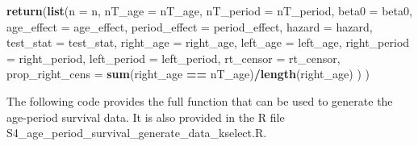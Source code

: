 \documentclass[11pt,]{article}
\newenvironment{Shaded}{\begin{snugshade}}{\end{snugshade}}
\newcommand{\KeywordTok}[1]{\textcolor[rgb]{0.13,0.29,0.53}{\textbf{#1}}}
\newcommand{\DataTypeTok}[1]{\textcolor[rgb]{0.13,0.29,0.53}{#1}}
\newcommand{\StringTok}[1]{\textcolor[rgb]{0.31,0.60,0.02}{#1}}
\newcommand{\OperatorTok}[1]{\textcolor[rgb]{0.81,0.36,0.00}{\textbf{#1}}}
\newcommand{\NormalTok}[1]{#1}
\begin{document}
\begin{Shaded}
\begin{Highlighting}[]
  \KeywordTok{return}\NormalTok{(}\KeywordTok{list}\NormalTok{(}\DataTypeTok{n =}\NormalTok{ n,}
              \DataTypeTok{nT_age =}\NormalTok{ nT_age,}
              \DataTypeTok{nT_period =}\NormalTok{ nT_period,}
              \DataTypeTok{beta0 =}\NormalTok{ beta0,}
              \DataTypeTok{age_effect =}\NormalTok{ age_effect,}
              \DataTypeTok{period_effect =}\NormalTok{ period_effect,}
              \DataTypeTok{hazard =}\NormalTok{ hazard,}
              \DataTypeTok{test_stat =}\NormalTok{ test_stat,}
              \DataTypeTok{right_age =}\NormalTok{ right_age,}
              \DataTypeTok{left_age =}\NormalTok{ left_age,}
              \DataTypeTok{right_period =}\NormalTok{ right_period,}
              \DataTypeTok{left_period =}\NormalTok{ left_period,}
              \DataTypeTok{rt_censor =}\NormalTok{ rt_censor,}
              \DataTypeTok{prop_right_cens =} \KeywordTok{sum}\NormalTok{(right_age }\OperatorTok{==}\StringTok{ }\NormalTok{nT_age)}\OperatorTok{/}\KeywordTok{length}\NormalTok{(right_age)}
\NormalTok{              )}
\NormalTok{  )}
\end{Highlighting}
\end{Shaded}

The following code provides the full function that can be used to
generate the age-period survival data. It is also provided in the R file
S4\_age\_period\_survival\_generate\_data\_kselect.R.
\end{document}
